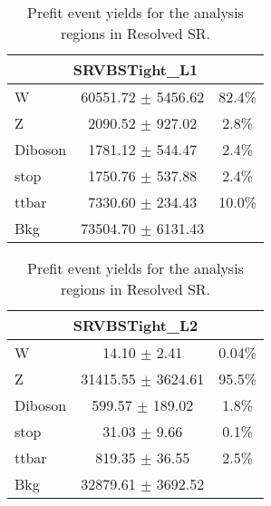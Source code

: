 \begin{table}
\caption{Prefit event yields for the analysis regions in \olep Resolved SR.}
\label{tab:PrefitYield_1lepResSR_Per}
\begin{center}
\begin{tabular}{|l|c|c|}
\hline
\multicolumn{3}{|c|}{SRVBSTight\_L1}\\ \hline
W & 60551.72 $\pm$ 5456.62 & 82.4\% \\
Z & 2090.52 $\pm$ 927.02 & 2.8\% \\
Diboson & 1781.12 $\pm$ 544.47 & 2.4\% \\
stop & 1750.76 $\pm$ 537.88 & 2.4\% \\
ttbar & 7330.60 $\pm$ 234.43 & 10.0\% \\
\hline
Bkg & 73504.70 $\pm$ 6131.43 & \\
\hline
\end{tabular}
\end{center}
\end{table}


\begin{table}
\caption{Prefit event yields for the analysis regions in \tlep Resolved SR.}
\label{tab:PrefitYield_2lepResSR_Per}
\begin{center}
\begin{tabular}{|l|c|c|}
\hline
\multicolumn{3}{|c|}{SRVBSTight\_L2}\\ \hline
W & 14.10 $\pm$ 2.41 & 0.04\% \\
Z & 31415.55 $\pm$ 3624.61 & 95.5\% \\
Diboson & 599.57 $\pm$ 189.02 & 1.8\% \\
stop & 31.03 $\pm$ 9.66 & 0.1\%\\
ttbar & 819.35 $\pm$ 36.55 & 2.5\% \\
\hline
Bkg & 32879.61 $\pm$ 3692.52 & \\
\hline
\end{tabular}
\end{center}
\end{table}
